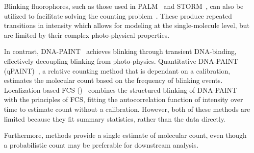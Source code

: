 %
Blinking fluorophores, such as those used in
PALM~\citep{sengupta_pcPALM_2011,lee_counting_2012} and
STORM~\citep{patel_blinking_2021}, can also be utilized to facilitate solving the counting
problem~\citep{rollins_stochastic_2015,nino_2017}.
  These produce repeated transitions in intensity which allows for modeling 
  at the single-molecule level, but are limited by their complex photo-physical properties. 


%
In contrast, DNA-PAINT~\citep{schnitzbauer_2017, stehr_2021} achieves blinking through transient 
DNA-binding, effectively decoupling blinking from photo-physics.
  Quantitative DNA-PAINT (qPAINT)~\citep{jungmann_2016}, a relative counting method that is 
  dependant on a calibration, estimates the molecular count based on the 
  frequency of blinking events. 
  Localization based FCS (\lbfcs)~\citep{stein_2019,stein_2021} combines the
  structured blinking of DNA-PAINT with the principles of FCS, fitting the
  autocorrelation function of intensity over time to estimate count 
  without a calibration.
  However, both of these methods are limited because they fit summary
  statistics, rather than the data directly.
  
Furthermore,  methods provide a single estimate of molecular count, even though 
a probabilistic count may be preferable for downstream analysis.

